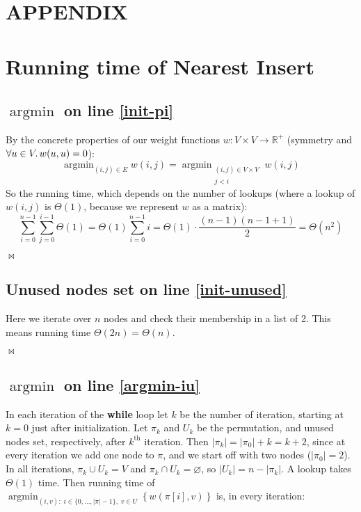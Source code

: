 \documentclass{article}
\DeclareMathOperator*{\argmin}{argmin}
\newcommand{\qed}{\begin{flushright}$\bowtie$\end{flushright}}
\newcommand{\bb}[1]{\textbf{#1}}
\newcommand{\ii}[1]{\textit{#1}}
\renewcommand{\thesection}{\Alph{section}}
\begin{document}
\appendix
\section*{APPENDIX}
\renewcommand{\thesection}{\roman{section}}
\section{Running time of Nearest Insert}
\label{appendix:runtime-ni}


\subsection{$\argmin$ on line \ref*{init-pi}}

By the concrete properties of our weight functions $w:V\times V\to\mathbb{R}^{+}$
(symmetry and $\forall u\in V\ldotp w(u,u)=0$):
\[ \argmin_{(i,j)\in E} w(i,j) = \argmin_{\substack{(i,j)\in V\times V\\j<i}} w(i,j) \]
So the running time, which depends on the number of lookups (where a lookup of $w(i,j)$
is $\Theta(1)$, because we represent $w$ as a matrix):
\[ \sum_{i=0}^{n-1} \sum_{j=0}^{i-1} \Theta(1) = \Theta(1) \sum_{i=0}^{n-1} i
  = \Theta(1) \cdot \frac{(n-1)(n-1+1)}{2} = \Theta(n^2) \]
\qed

\subsection{Unused nodes set on line \ref*{init-unused}}

Here we iterate over $n$ nodes and check their membership in a list of 2. This means
running time $\Theta(2n) = \Theta(n)$. \qed

\subsection{$\argmin$ on line \ref*{argmin-iu}}

In each iteration of the \bb{while} loop let $k$ be the number of iteration,
starting at $k=0$ just after initialization. Let $\pi_k$ and $U_k$ be the permutation,
and unused nodes set, respectively, after $k^{\mathrm{th}}$ iteration.
Then $|\pi_k| = |\pi_0|+k = k+2$, since at every iteration we
add one node to $\pi$, and we start off with two nodes ($|\pi_0|=2$). In all iterations,
$\pi_k\cup U_k=V$ and $\pi_k\cap U_k=\varnothing$, so $|U_k|=n-|\pi_k|$. A lookup takes
$\Theta(1)$ time. Then running time of $\argmin_{(i,v):\;i\in\{0,...,|\pi|-1\},\;v\in U}
\left\{w\left(\pi[i], v\right)\right\}$ is, in every iteration:
\end{document}
